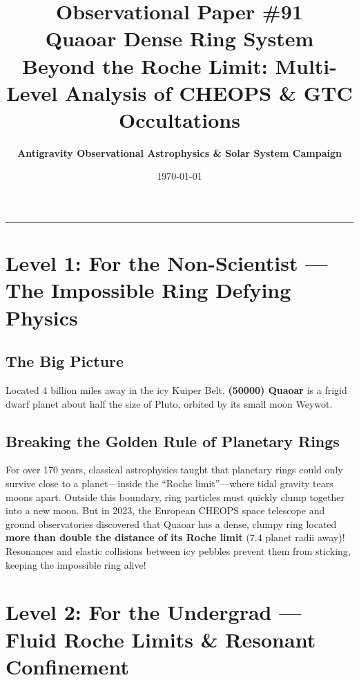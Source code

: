 \documentclass[11pt,a4paper]{article}
\title{\Huge \textbf{Observational Paper \#91}\\ \Large Quaoar Dense Ring System Beyond the Roche Limit: Multi-Level Analysis of CHEOPS \& GTC Occultations}
\author{\textbf{Antigravity Observational Astrophysics \& Solar System Campaign}}
\date{\today}
\begin{document}
\maketitle

\vspace{-1em}
\begin{center}
\rule{\textwidth}{1.5pt}
\end{center}

\section*{Level 1: For the Non-Scientist — The Impossible Ring Defying Physics}

\subsection*{The Big Picture}
Located 4 billion miles away in the icy Kuiper Belt, \textbf{(50000) Quaoar} is a frigid dwarf planet about half the size of Pluto, orbited by its small moon Weywot.

\subsection*{Breaking the Golden Rule of Planetary Rings}
For over 170 years, classical astrophysics taught that planetary rings could only survive close to a planet—inside the ``Roche limit''—where tidal gravity tears moons apart. Outside this boundary, ring particles must quickly clump together into a new moon. But in 2023, the European CHEOPS space telescope and ground observatories discovered that Quaoar has a dense, clumpy ring located \textbf{more than double the distance of its Roche limit} ($7.4$ planet radii away)! Resonances and elastic collisions between icy pebbles prevent them from sticking, keeping the impossible ring alive!

\newpage

\section*{Level 2: For the Undergrad — Fluid Roche Limits \& Resonant Confinement}
\end{document}

